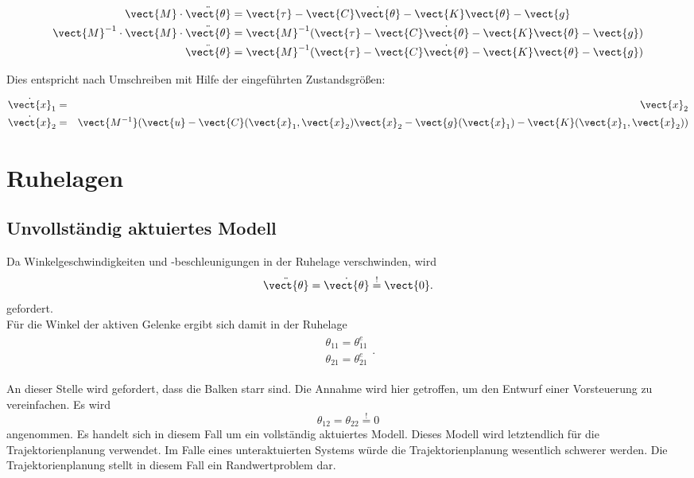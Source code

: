 \begin{align*}
\vect{M} \cdot \ddot{\vect{\theta}}		 &= \vect{\tau}-\vect{C} \dot{\vect{\theta}}-\vect{K} \vect{\theta}-\vect{g} 			\\
\vect{M}^{-1}\cdot \vect{M} \cdot \ddot{\vect{\theta}} &= \vect{M}^{-1}(\vect{\tau}-\vect{C} \dot{\vect{\theta}}-\vect{K}\vect{\theta}-\vect{g})	\\
\ddot{\vect{\theta}}				 &= \vect{M}^{-1}(\vect{\tau}-\vect{C}\dot{\vect{\theta}}-\vect{K}\vect{\theta}-\vect{g})
\end{align*}

Dies entspricht nach Umschreiben mit Hilfe der eingeführten Zustandsgrößen:

\begin{align}
\begin{aligned}
\dot{\vect{x}}_\mathrm{1} & = & \vect{x}_\mathrm{2} \\
\dot{\vect{x}}_\mathrm{2} & = & \vect{M^{-1}}(\vect{u}- \vect{C}(\vect{x}_\mathrm{1},\vect{x}_\mathrm{2})\vect{x}_\mathrm{2}-\vect{g}(\vect{x}_\mathrm{1})-\vect{K}(\vect{x}_\mathrm{1},\vect{x}_\mathrm{2}))
\end{aligned}
\end{align}

\section{Ruhelagen}
\subsection{Unvollständig aktuiertes Modell}
Da Winkelgeschwindigkeiten und -beschleunigungen in der Ruhelage verschwinden, wird 
\begin{equation}\label{eq:uva_winkel}
\ddot{\vect{\theta}} = \dot{\vect{\theta}} \stackrel{!}{=} \vect{0}.
\end{equation}
gefordert.\\
Für die Winkel der aktiven Gelenke ergibt sich damit in der Ruhelage
\begin{align}\label{eq:uva_momente}
\begin{aligned}
\theta_\mathrm{11} = \theta^e_\mathrm{11}\\
\theta_\mathrm{21} = \theta^e_\mathrm{21}
\end{aligned}.
\end{align}

An dieser Stelle wird gefordert, dass die Balken starr sind. Die Annahme wird hier getroffen, um den Entwurf einer Vorsteuerung zu vereinfachen. Es wird
\begin{equation}\label{eq:uva_winkel_passiv}
\theta_\mathrm{12} = \theta_\mathrm{22} \stackrel{!}{=} 0
\end{equation}
angenommen. Es handelt sich in diesem Fall um ein vollständig aktuiertes Modell. Dieses Modell wird letztendlich für die Trajektorienplanung verwendet. Im Falle eines unteraktuierten Systems würde die Trajektorienplanung wesentlich schwerer werden. Die Trajektorienplanung stellt in diesem Fall ein Randwertproblem dar.

